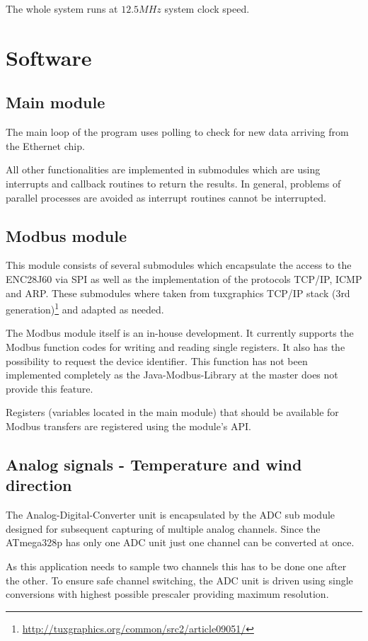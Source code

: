 The whole system runs at $12.5 MHz$ system clock speed.

\section{Software}

\subsection{Main module}
The main loop of the program uses polling to check for new data arriving from the Ethernet chip.

All other functionalities are implemented in submodules which are using interrupts and callback routines to return the results. In general, problems of parallel processes are avoided as interrupt routines cannot be interrupted.

\subsection{Modbus module}
This module consists of several submodules which encapsulate the access to the ENC28J60 via SPI as well as the implementation of the protocols TCP/IP, ICMP and ARP. These submodules where taken from tuxgraphics TCP/IP stack (3rd generation)\footnote{\url{http://tuxgraphics.org/common/src2/article09051/}} and adapted as needed.

The Modbus module itself is an in-house development. It currently supports the Modbus function codes for writing and reading single registers. It also has the possibility to request the device identifier. This function has not been implemented completely as the Java-Modbus-Library at the master does not provide this feature.

Registers (variables located in the main module) that should be available for Modbus transfers are registered using the module's API.

\subsection{Analog signals - Temperature and wind direction}
The Analog-Digital-Converter unit is encapsulated by the ADC sub module designed for subsequent capturing of multiple analog channels.
Since the ATmega328p has only one ADC unit just one channel can be converted at once.

As this application needs to sample two channels this has to be done one after the other. To ensure safe channel switching, the ADC unit is driven using single conversions with highest possible prescaler providing maximum resolution.

